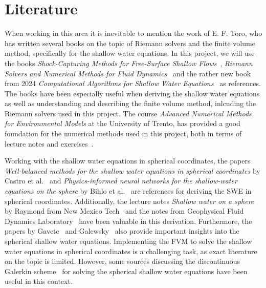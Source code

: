 \section{Literature}
When working in this area it is inevitable to mention the work of E. F. Toro, who has written several books on the topic of Riemann solvers and the finite volume method, specifically for the shallow water equations.
In this project, we will use the books \textit{Shock-Capturing Methods for Free-Surface Shallow Flows}~\cite{Toro2001-Shock}, \textit{Riemann Solvers and Numerical Methods for Fluid Dynamics}~\cite{Toro2009-Riemann} and the rather new book from 2024 \textit{Computational Algorithms for Shallow Water Equations}~\cite{Toro2024} as references.
The books have been especially useful when deriving the shallow water equations as well as understanding and describing the finite volume method, inlcuding the Riemann solvers used in this project.
The course \textit{Advanced Numerical Methods for Environmental Models} at the University of Trento, has provided a good foundation for the numerical methods used in this project, both in terms of lecture notes and exercises~\cite{trento_course}.

Working with the shallow water equations in spherical coordinates, the papers \textit{Well-balanced methods for the shallow water equations in spherical coordinates} by Castro et al.~\cite{Castro2017} and \textit{Physics-informed neural networks for the shallow-water equations on the sphere} by Bihlo et al.~\cite{Bihlo2022} are references for deriving the SWE in spherical coordinates.
Additionally, the lecture notes \textit{Shallow water on a sphere} by Raymond from New Mexico Tech~\cite{Raymond} and the notes from Geophysical Fluid Dynamics Laboratory~\cite{shallow_water_gfdl} have been valuable in this derivation.
Furthermore, the papers by Gavete~\cite{Gavete_2009} and Galewsky~\cite{Galewsky_2004} also provide important insights into the spherical shallow water equations.
Implementing the FVM to solve the shallow water equations in spherical coordinates is a challenging task, as exact literature on the topic is limited.
However, some sources discussing the discontinuous Galerkin scheme~\cite{Hesthaven2008} for solving the spherical shallow water equations have been useful in this context.

